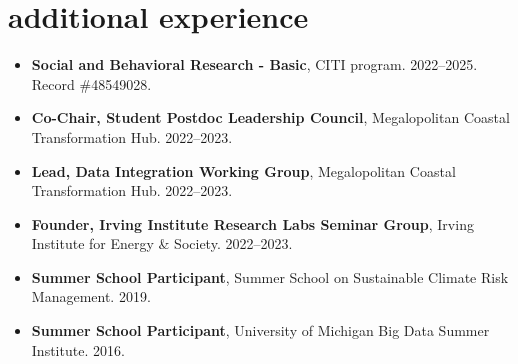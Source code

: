 \documentclass[10pt,oneside]{article}
\begin{document}

\section{additional experience}

\mbox{}\vspace{-\dimexpr\baselineskip\relax}

\begin{itemize}[label={}]

  \item \textbf{Social and Behavioral Research - Basic}, CITI program. 2022--2025.\\Record \#48549028.

  \item \textbf{Co-Chair, Student Postdoc Leadership Council}, Megalopolitan Coastal Transformation Hub. 2022--2023.

  \item \textbf{Lead, Data Integration Working Group}, Megalopolitan Coastal Transformation Hub. 2022--2023.

  \item \textbf{Founder, Irving Institute Research Labs Seminar Group}, Irving Institute for Energy \& Society. 2022--2023.

  \item \textbf{Summer School Participant}, Summer School on Sustainable Climate Risk Management. 2019.

  \item \textbf{Summer School Participant}, University of Michigan Big Data Summer Institute. 2016.

\end{itemize}
\end{document}
